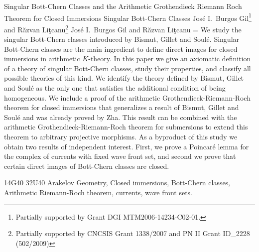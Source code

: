\documentclass[10pt,twoside]{article}
\def\TSkip{\bigskip}
\def\Abstract{\begingroup\narrower
    \parskip=\medskipamount\parindent=0pt{\caps Abstract. }}
\def\EndAbstract{\par\endgroup\TSkip}
\numberwithin{equation}{section}
\theoremstyle{plain}
\theoremstyle{definition}
\begin{document}
\Title
Singular Bott-Chern Classes 
and the Arithmetic Grothendieck
Riemann Roch Theorem for Closed Immersions
\ShortTitle 
Singular Bott-Chern Classes
\SubTitle   
\Author Jos\'e I.~Burgos Gil\footnote{Partially supported by Grant %
DGI MTM2006-14234-C02-01.}
and R\u azvan Li\c tcanu\footnote{Partially supported by CNCSIS Grant %
  1338/2007 and PN II Grant ID\_2228 (502/2009)}
\ShortAuthor
Jos\'e I.~Burgos Gil and  R\u azvan Li\c tcanu
\EndTitle
\Abstract 
We study the singular Bott-Chern classes introduced by
Bismut, Gillet and Soul\'e. Singular Bott-Chern classes are the main
ingredient to define direct images for closed immersions in arithmetic
$K$-theory. In this paper we give an axiomatic definition of a theory
of singular Bott-Chern classes, study their properties, and
classify all possible
theories of this kind. We identify the theory defined by Bismut,
Gillet and Soul\'e 
as the only one that satisfies the additional condition of being
homogeneous. We include a proof of the arithmetic
Grothendieck-Riemann-Roch theorem for closed immersions that
generalizes a result of Bismut, Gillet and Soul\'e and was already
proved by Zha. This result can be combined with the arithmetic
Grothendieck-Riemann-Roch theorem for submersions to extend this
theorem to arbitrary projective morphisms. As a byproduct of this study we
obtain two results of independent interest. First, we prove a
Poincar\'e lemma for the complex of currents with fixed wave front set,
and second we prove that certain direct images of Bott-Chern classes
are closed.
\EndAbstract
\MSC 
14G40 32U40 
\EndMSC
\KEY 
Arakelov Geometry, Closed immersions, Bott-Chern classes, Arithmetic
Riemann-Roch theorem, currents, wave front sets. 
\EndKEY
\end{document}
